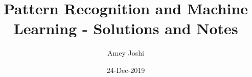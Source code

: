 \documentclass{report}
\title{Pattern Recognition and Machine Learning - Solutions and Notes}
\author{Amey Joshi}
\date{24-Dec-2019}
\begin{document}
\begin{titlepage}
\maketitle
\thispagestyle{empty}
\end{titlepage}

\tableofcontents
\thispagestyle{empty}

%


\theoremstyle{plain}
\newtheorem{thm}{Theorem}[section]

\theoremstyle{plain}
\newtheorem{prop}{Proposition}[section]

\theoremstyle{plain}
\newtheorem{lem}{Lemma}[section]

\theoremstyle{plain}
\newtheorem{corr}{Corollary}[section]

\theoremstyle{definition}
\newtheorem{defn}{Definition}[section]

\theoremstyle{remark}
\newtheorem*{rem}{Remark}


%
%
\end{document}
